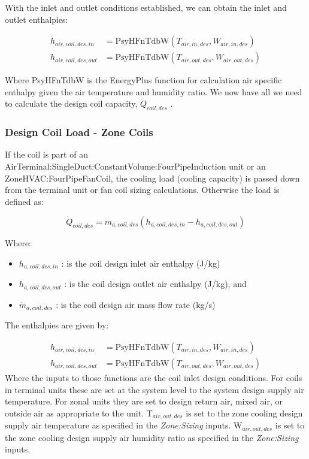 With the inlet and outlet conditions established, we can obtain the inlet and outlet enthalpies:

\begin{equation}
 \begin{array}{rl}
  h_{air,coil,des,in} & = \text{PsyHFnTdbW}\left(T_{air,in,des},W_{air,in,des}\right) \\
  h_{air,coil,des,out} & = \text{PsyHFnTdbW}\left(T_{air,out,des},W_{air,out,des}\right)
 \end{array}
\end{equation}

Where PsyHFnTdbW is the EnergyPlus function for calculation air specific enthalpy given the air temperature and humidity ratio. We now have all we need to calculate the design coil capacity, \(\dot{Q}_{coil,des}\) .

\subsubsection{Design Coil Load - Zone Coils}\label{design-coil-load---zone-coils}

If the coil is part of an AirTerminal:SingleDuct:ConstantVolume:FourPipeInduction unit or an ZoneHVAC:FourPipeFanCoil, the cooling load (cooling capacity) is passed down from the terminal unit or fan coil sizing calculations. Otherwise the load is defined as:

\begin{equation}
\dot{Q}_{coil,des} = \dot{m}_{a,coil,des}\left(h_{a,coil,des,in}-h_{a,coil,des,out}\right)
\end{equation}

Where:

\begin{itemize}
\item
  \(h_{a,coil,des,in}\) : is the coil design inlet air enthalpy (J/kg)
\item
  \(h_{a,coil,des,out}\) : is the coil design outlet air enthalpy (J/kg), and
\item
  \(\dot{m}_{a,coil,des}\) : is the coil design air mass flow rate (kg/s)
\end{itemize}

The enthalpies are given by:

\begin{equation}
 \begin{array}{lr}
  h_{air,coil,des,in} & = \text{PsyHFnTdbW}\left(T_{air,in,des},W_{air,in,des}\right) \\
  h_{air,coil,des,out} & = \text{PsyHFnTdbW}\left(T_{air,out,des},W_{air,out,des}\right)
 \end{array}
\end{equation}
Where the inputs to those functions are the coil inlet design conditions. For coils in terminal units these are set at the system level to the system design supply air temperature. For zonal units they are set to design return air, mixed air, or outside air as appropriate to the unit. T\(_{air,out,des}\) is set to the zone cooling design supply air temperature as specified in the \emph{Zone:Sizing} inputs. W\(_{air,out,des}\) is set to the zone cooling design supply air humidity ratio as specified in the \emph{Zone:Sizing} inputs.

